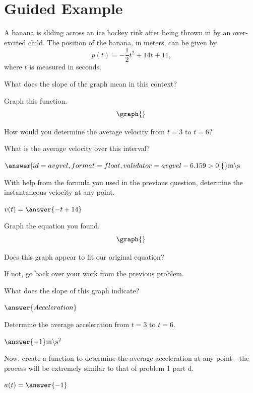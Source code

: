 \documentclass{ximera}
\begin{document}
\section{Guided Example}
\begin{question}
A banana is sliding across an ice hockey rink after being thrown in by an over-excited child. The position of the banana, in meters, can be given by $$p(t) = -\dfrac{1}{2}t^2+14t+11\text{,}$$ where $t$ is measured in seconds.

What does the slope of the graph mean in this context?
\begin{multipleChoice}
\end{multipleChoice}

Graph this function.
\[
    \graph{}
\]

How would you determine the average velocity from $t = 3$ to $t = 6$?

\begin{multipleChoice}
\end{multipleChoice}


What is the average velocity over this interval?

$\answer[id = avgvel, format=float,validator=avgvel-6.159>0]{}\text{m} \backslash \text{s}$

With help from the formula you used in the previous question, determine the instantaneous velocity at any point.

$v(t) =  \answer{-t+14}$


Graph the equation you found.
\[
    \graph{}
\]

Does this graph appear to fit our original equation?

\begin{multipleChoice}
\end{multipleChoice}

If not, go back over your work from the previous problem.


What does the slope of this graph indicate?

\begin{multipleChoice}
\end{multipleChoice}
$\answer{Acceleration}$

Determine the average acceleration from $t = 3$ to $t = 6$.

$\answer{-1} \text{m} \backslash \text{s}^2$

Now, create a function to determine the average acceleration at any point - the process will be extremely similar to that of problem 1 part d.

$a(t) = \answer{-1}$
\end{question}
\end{document}
